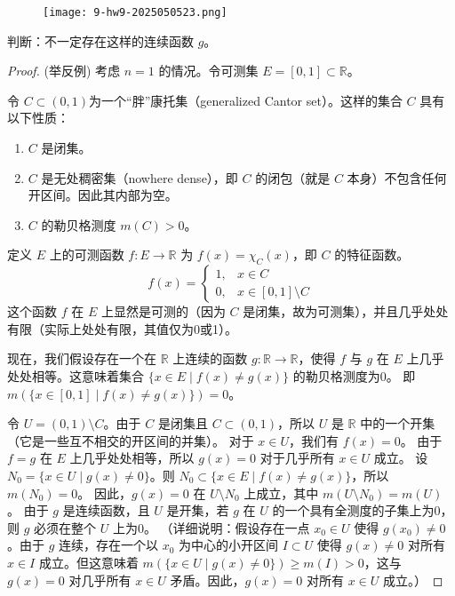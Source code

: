 \begin{exercise}
\begin{figure}[H]
\centering
\texttt{[image: 9-hw9-2025050523.png]}
\label{}
\end{figure}
\end{exercise}
判断：不一定存在这样的连续函数 $g$。

\begin{proof}
(举反例) 考虑 $n=1$ 的情况。令可测集 $E = [0,1] \subset \mathbb{R}$。

令 $C \subset (0,1)$为一个“胖”康托集（generalized Cantor set）。这样的集合 $C$ 具有以下性质：

\begin{enumerate}
	\item $C$ 是闭集。
	\item $C$ 是无处稠密集（nowhere dense），即 $C$ 的闭包（就是 $C$ 本身）不包含任何开区间。因此其内部为空。
	\item $C$ 的勒贝格测度 $m(C) > 0$。
\end{enumerate}

定义 $E$ 上的可测函数 $f: E \to \mathbb{R}$ 为 $f(x) = \chi_C(x)$，即 $C$ 的特征函数。
\[
f(x) = \begin{cases} 1, & x \in C \\ 0, & x \in [0,1] \setminus C \end{cases}
\]
这个函数 $f$ 在 $E$ 上显然是可测的（因为 $C$ 是闭集，故为可测集），并且几乎处处有限（实际上处处有限，其值仅为0或1）。

现在，我们假设存在一个在 $\mathbb{R}$ 上连续的函数 $g: \mathbb{R} \to \mathbb{R}$，使得 $f$ 与 $g$ 在 $E$ 上几乎处处相等。这意味着集合 $\{x \in E \mid f(x) \neq g(x)\}$ 的勒贝格测度为0。
即 $m(\{x \in [0,1] \mid f(x) \neq g(x)\}) = 0$。

令 $U = (0,1) \setminus C$。由于 $C$ 是闭集且 $C \subset (0,1)$，所以 $U$ 是 $\mathbb{R}$ 中的一个开集（它是一些互不相交的开区间的并集）。
对于 $x \in U$，我们有 $f(x) = 0$。
由于 $f=g$ 在 $E$ 上几乎处处相等，所以 $g(x) = 0$ 对于几乎所有 $x \in U$ 成立。
设 $N_0 = \{x \in U \mid g(x) \neq 0\}$。则 $N_0 \subset \{x \in E \mid f(x) \neq g(x)\}$，所以 $m(N_0)=0$。
因此，$g(x)=0$ 在 $U \setminus N_0$ 上成立，其中 $m(U \setminus N_0) = m(U)$。
由于 $g$ 是连续函数，且 $U$ 是开集，若 $g$ 在 $U$ 的一个具有全测度的子集上为0，则 $g$ 必须在整个 $U$ 上为0。
（详细说明：假设存在一点 $x_0 \in U$ 使得 $g(x_0) \neq 0$。由于 $g$ 连续，存在一个以 $x_0$ 为中心的小开区间 $I \subset U$ 使得 $g(x) \neq 0$ 对所有 $x \in I$ 成立。但这意味着 $m(\{x \in U \mid g(x) \neq 0\}) \ge m(I) > 0$，这与 $g(x)=0$ 对几乎所有 $x \in U$ 矛盾。因此，$g(x)=0$ 对所有 $x \in U$ 成立。）


\end{proof}
